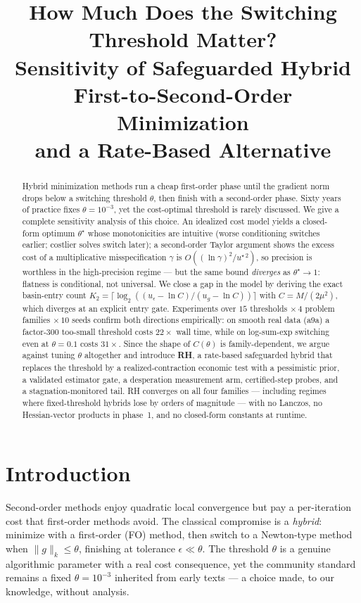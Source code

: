 ﻿\documentclass[10pt]{article}
\title{\bf How Much Does the Switching Threshold Matter?\\
\large Sensitivity of Safeguarded Hybrid First-to-Second-Order
Minimization\\ and a Rate-Based Alternative}
\author{}
\date{}
\newcommand{\gnorm}{\lVert g\rVert}
\begin{document}
\maketitle
\vspace{-2em}

\begin{abstract}
Hybrid minimization methods run a cheap first-order phase until the
gradient norm drops below a switching threshold $\theta$, then finish
with a second-order phase. Sixty years of practice fixes
$\theta=10^{-3}$, yet the cost-optimal threshold is rarely discussed.
We give a complete sensitivity analysis of this choice. An idealized
cost model yields a closed-form optimum $\theta^\star$ whose
monotonicities are intuitive (worse conditioning switches earlier;
costlier solves switch later); a second-order Taylor argument shows the
excess cost of a multiplicative misspecification $\gamma$ is
$O((\ln\gamma)^2/u^{\star\,2})$, so precision is worthless in the
high-precision regime --- but the same bound \emph{diverges} as
$\theta^\star\to 1$: flatness is conditional, not universal. We close a
gap in the model by deriving the exact basin-entry count
$K_2=\lceil\log_2((u_\epsilon-\ln C)/(u_g-\ln C))\rceil$ with
$C=M/(2\mu^2)$, which diverges at an explicit entry gate. Experiments
over $15$ thresholds $\times\,4$ problem families $\times\,10$ seeds
confirm both directions empirically: on smooth real data (a9a) a
factor-$300$ too-small threshold costs $22\times$ wall time, while on
log-sum-exp switching even at $\theta=0.1$ costs $31\times$. Since the
shape of $C(\theta)$ is family-dependent, we argue against tuning
$\theta$ altogether and introduce \textbf{RH}, a rate-based safeguarded
hybrid that replaces the threshold by a realized-contraction economic
test with a pessimistic prior, a validated estimator gate, a desperation
measurement arm, certified-step probes, and a stagnation-monitored
tail. RH converges on all four families --- including regimes where
fixed-threshold hybrids lose by orders of magnitude --- with no Lanczos,
no Hessian-vector products in phase~1, and no closed-form constants at
runtime.
\end{abstract}

\section{Introduction}\label{sec:intro}

Second-order methods enjoy quadratic local convergence but pay a
per-iteration cost that first-order methods avoid. The classical
compromise is a \emph{hybrid}: minimize with a first-order (FO) method,
then switch to a Newton-type method when $\gnorm_k\le\theta$, finishing
at tolerance $\epsilon\ll\theta$. The threshold $\theta$ is a genuine
algorithmic parameter with a real cost consequence, yet the community
standard remains a fixed $\theta=10^{-3}$ inherited from early texts ---
a choice made, to our knowledge, without analysis.
\end{document}
